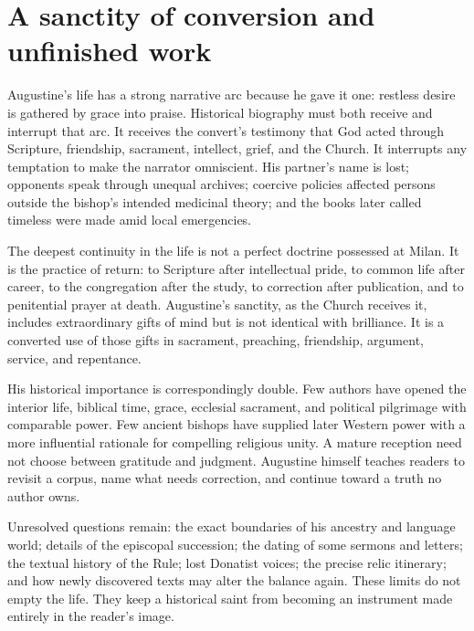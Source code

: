 \section{A sanctity of conversion and unfinished work}\label{sec:aug-synthesis}

Augustine's life has a strong narrative arc because he gave it one: restless
desire is gathered by grace into praise. Historical biography must both
receive and interrupt that arc. It receives the convert's testimony that God
acted through Scripture, friendship, sacrament, intellect, grief, and the
Church. It interrupts any temptation to make the narrator omniscient. His
partner's name is lost; opponents speak through unequal archives; coercive
policies affected persons outside the bishop's intended medicinal theory; and
the books later called timeless were made amid local emergencies.

The deepest continuity in the life is not a perfect doctrine possessed at
Milan. It is the practice of return: to Scripture after intellectual pride, to
common life after career, to the congregation after the study, to correction
after publication, and to penitential prayer at death. Augustine's sanctity,
as the Church receives it, includes extraordinary gifts of mind but is not
identical with brilliance. It is a converted use of those gifts in sacrament,
preaching, friendship, argument, service, and repentance.

His historical importance is correspondingly double. Few authors have opened
the interior life, biblical time, grace, ecclesial sacrament, and political
pilgrimage with comparable power. Few ancient bishops have supplied later
Western power with a more influential rationale for compelling religious
unity. A mature reception need not choose between gratitude and judgment.
Augustine himself teaches readers to revisit a corpus, name what needs
correction, and continue toward a truth no author owns.

Unresolved questions remain: the exact boundaries of his ancestry and language
world; details of the episcopal succession; the dating of some sermons and
letters; the textual history of the Rule; lost Donatist voices; the precise
relic itinerary; and how newly discovered texts may alter the balance again.
These limits do not empty the life. They keep a historical saint from becoming
an instrument made entirely in the reader's image.
